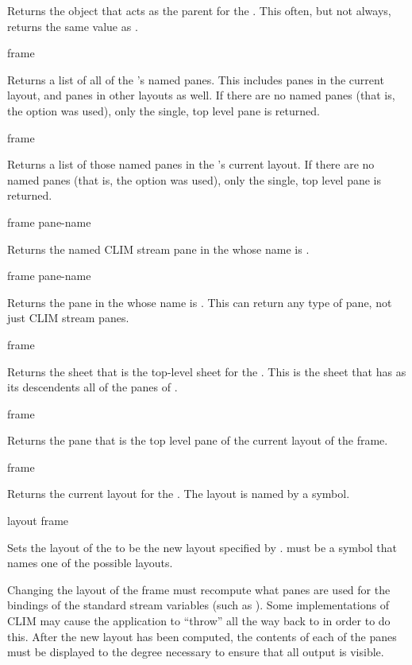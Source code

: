 Returns the object that acts as the parent for the  .
This often, but not always, returns the same value as .


 {frame}

Returns a list of all of the  's named panes.  This
includes panes in the current layout, and panes in other layouts as well.  If
there are no named panes (that is, the  option was used), only the
single, top level pane is returned.
\ReadOnly

 {frame}

Returns a list of those named panes in the  's current
layout.  If there are no named panes (that is, the  option was used),
only the single, top level pane is returned.
\ReadOnly

 {frame pane-name}

Returns the named CLIM stream pane in the   whose name is
.

 {frame pane-name}

Returns the pane in the   whose name is .
This can return any type of pane, not just CLIM stream panes.


 {frame}

Returns the sheet that is the top-level sheet for the  .
This is the sheet that has as its descendents all of the panes of .

 {frame}

Returns the pane that is the top level pane of the current layout of the frame.

 {frame}

Returns the current layout for the  .  The layout is
named by a symbol.

 {layout frame}

Sets the layout of the   to be the new layout specified
by .   must be a symbol that names one of the
possible layouts.

Changing the layout of the frame must recompute what panes are used for the
bindings of the standard stream variables (such as ).  Some
implementations of CLIM may cause the application to ``throw'' all the way back
to  in order to do this.  After the new layout has been
computed, the contents of each of the panes must be displayed to the degree
necessary to ensure that all output is visible.

